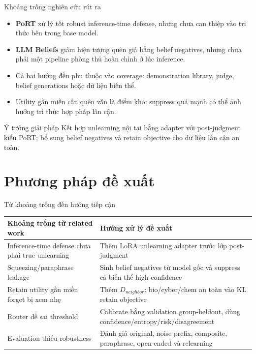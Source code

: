 \documentclass[t, aspectratio=169]{beamer}
\newcommand{\term}[1]{\textbf{\textcolor{hustprimary}{#1}}}
\newcommand{\rowrule}{\midrule[0.25pt]}
\begin{document}
\begin{frame}{Khoảng trống nghiên cứu rút ra}
  \small
  \begin{itemize}
    \item \term{PoRT} xử lý tốt robust inference-time defense, nhưng chưa can thiệp vào tri thức bên trong base model.
    
    \item \term{LLM Beliefs} giảm hiện tượng quên giả bằng belief negatives, nhưng chưa phải một pipeline phòng thủ hoàn chỉnh ở lúc inference.
    
    \item Cả hai hướng đều phụ thuộc vào coverage: demonstration library, judge, belief generations hoặc dữ liệu biến thể.
    
    \item Utility gần miền cần quên vẫn là điểm khó: suppress quá mạnh có thể ảnh hưởng tri thức hợp pháp lân cận.
  \end{itemize}

  \vspace{0.4em}
  \begin{alertblock}{Ý tưởng giải pháp}
    Kết hợp unlearning nội tại bằng adapter với post-judgment kiểu PoRT; bổ sung belief negatives và retain objective cho dữ liệu lân cận an toàn.
  \end{alertblock}
\end{frame}

\section{Phương pháp đề xuất}

\begin{frame}{Từ khoảng trống đến hướng tiếp cận}
  \scriptsize
  \begin{tabularx}{\textwidth}{Y Y}
    \toprule
    \textbf{Khoảng trống từ related work} & \textbf{Hướng xử lý đề xuất} \\
    \midrule
    Inference-time defense chưa phải true unlearning & Thêm LoRA unlearning adapter trước lớp post-judgment \\
    \rowrule
    Squeezing/paraphrase leakage & Sinh belief negatives từ model gốc và suppress cả biến thể high-confidence \\
    \rowrule
    Retain utility gần miền forget bị xem nhẹ & Thêm $D_{neighbor}$: bio/cyber/chem an toàn vào KL retain objective \\
    \rowrule
    Router dễ sai threshold & Calibrate bằng validation group-heldout, dùng confidence/entropy/risk/disagreement \\
    \rowrule
    Evaluation thiếu robustness & Đánh giá original, noise prefix, composite, paraphrase, open-ended và relearning \\
    \bottomrule
  \end{tabularx}
\end{frame}
\end{document}
